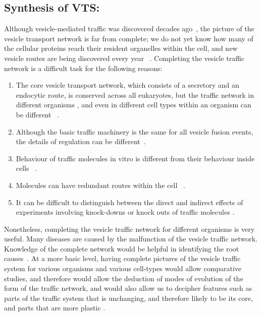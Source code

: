 \subsection{Synthesis of VTS:}
Although vesicle-mediated traffic was discovered decades ago~\cite{wells2005discovery}, the picture of the vesicle transport network is far from complete; we do not yet know how many of the cellular proteins reach their resident organelles within the cell, and new vesicle routes are being discovered every year ~\cite{nickel2018unconventional,weill2018toolbox}. 
%
Completing the vesicle traffic network is a difficult task for the following reasons: 
\begin{enumerate}
	\item The core vesicle transport network, which consists of a secretory and an endocytic route, is conserved across all eukaryotes, but the traffic network in different organisms \cite{richardson2015evolutionary,nishimoto2009differential,barlow2017seeing}, and even in different cell types within an organism can be different ~\cite{stoops2014trafficking,zhou2015arp2}.
	
	\item Although the basic traffic machinery is the same for all vesicle fusion events, the details of regulation can be different~\cite{davletov2007regulation,di2010calcium}.
	
	\item Behaviour of traffic molecules in vitro is different from their behaviour inside cells ~\cite{furukawa2014multiple}.
	
	\item Molecules can have redundant routes within the cell ~\cite{shimizu2014compensatory,nakatsukasa2014nutrient}.
	
	\item It can be difficult to distinguish between the direct and indirect effects of experiments involving knock-downs or knock outs of traffic molecules \cite{hirst2004epsinr,mishev2013small}.
\end{enumerate}

Nonetheless, completing the vesicle traffic network for different organisms is very useful. 
%
Many diseases are caused by the malfunction of the vesicle traffic network. 
%
Knowledge of the complete network would be helpful in identifying the root causes~\cite{bexiga2013human,gissen2007cargos}. 
%
At a more basic level, having complete pictures of the vesicle traffic system for various organisms and various cell-types would allow comparative studies, and therefore would allow the deduction of modes of evolution of the form of the traffic network, and would also allow us to decipher features such as parts of the traffic system that is unchanging, and therefore likely to be its core, and parts that are more plastic \cite{barlow2017seeing}.

